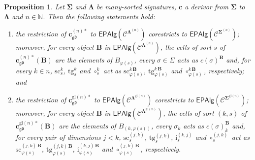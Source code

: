 \documentclass[a4paper, reqno
]{amsart}
\newcommand{\sig}[1]{\mathbf{#1}}             %
\newcommand{\spec}[1]{\boldsymbol{\mathcal{#1}}} %
\newcommand{\gd}{\mathfrak{gd}}              %
\newcommand{\gl}{\mathrm{gl}}                %
\newcommand{\src}{\mathrm{sc}}
\newcommand{\tgt}{\mathrm{tg}}
\theoremstyle{plain}
\newtheorem{proposition}[theorem]{Proposition}
\theoremstyle{definition}
\begin{document}
\begin{proposition}\label{PChangeSigDerivor}
Let $\sig{\Sigma}$ and $\sig{\Lambda}$ be many-sorted signatures, $\mathbf{c}$ a derivor from $\sig{\Sigma}$ to $\sig{\Lambda}$ and $n\in\mathbb{N}$.
Then the following statements hold:
\begin{enumerate}
\item the restriction of $\mathbf{c}^{(n)\ast}_{\gd}$ to $\mathsf{EPAlg}(\spec{C}^{\sig{\Lambda}^{(n)}})$ corestricts to $\mathsf{EPAlg}(\spec{C}^{\sig{\Sigma}^{(n)}})$; moreover, for every object $\mathbf{B}$ in $\mathsf{EPAlg}(\spec{C}^{\sig{\Lambda}^{(n)}})$, the cells of sort $s$ of $\mathbf{c}^{(n)\ast}_{\gd}(\mathbf{B})$ are the elements of $B_{\varphi(s)}$, every $\sigma\in\Sigma$ acts as $c(\sigma)^{\mathbf{B}}$ and, for every $k\in n$, $\src^{k}_{s}$, $\tgt^{k}_{s}$ and $\circ^{k}_{s}$ act as $\src^{k\,\mathbf{B}}_{\varphi(s)}$, $\tgt^{k\,\mathbf{B}}_{\varphi(s)}$ and $\circ^{k\,\mathbf{B}}_{\varphi(s)}$, respectively; and
\item the restriction of $\mathbf{c}^{\gl(n)\ast}_{\gd}$ to $\mathsf{EPAlg}(\spec{C}^{\sig{\Lambda}^{\gl(n)}})$ corestricts to $\mathsf{EPAlg}(\spec{C}^{\sig{\Sigma}^{\gl(n)}})$; moreover, for every object $\mathbf{B}$ in $\mathsf{EPAlg}(\spec{C}^{\sig{\Lambda}^{\gl(n)}})$, the cells of sort $(k,s)$ of $\mathbf{c}^{\gl(n)\ast}_{\gd}(\mathbf{B})$ are the elements of $B_{(k,\varphi(s))}$, every $\sigma_{k}$ acts as $c(\sigma)_{k}^{\mathbf{B}}$ and, for every pair of dimensions $j<k$, $\src^{(j,k)}_{s}$, $\tgt^{(j,k)}_{s}$, $\mathrm{i}^{(k,j)}_{s}$ and $\circ^{(j,k)}_{s}$ act as $\src^{(j,k)\,\mathbf{B}}_{\varphi(s)}$, $\tgt^{(j,k)\,\mathbf{B}}_{\varphi(s)}$, $\mathrm{i}^{(k,j)\,\mathbf{B}}_{\varphi(s)}$ and $\circ^{(j,k)\,\mathbf{B}}_{\varphi(s)}$, respectively.
\end{enumerate}
\end{proposition}
\end{document}
